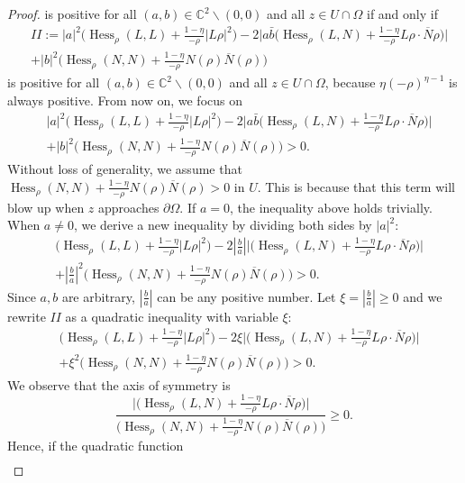 \documentclass[11pt]{article}
\theoremstyle{plain} \numberwithin{equation}{section}
\theoremstyle{definition}
\DeclareMathOperator{\Hessian}{Hess}
\begin{document}
\begin{proof}
	is positive for all $(a,b)\in\mathbb{C}^2\backslash(0,0)$ and all $z\in U\cap\Omega$ if and only if \[\begin{split}
	&I\!I:=|a|^2\Big(\Hessian_\rho (L, L)+\frac{1-\eta}{-\rho}|L\rho|^2\Big)-2\Big|a\bar{b}\Big(\Hessian_\rho (L, N)+\frac{1-\eta}{-\rho}L\rho\cdot\overline{N}\rho\Big)\Big|\\&+|b|^2 \Big(\Hessian_\rho (N, N)+\frac{1-\eta}{-\rho}N(\rho)\overline{N} (\rho)\Big)
	\end{split}\] is positive for all $(a,b)\in\mathbb{C}^2\backslash(0,0)$ and all $z\in U\cap\Omega$, because $\eta(-\rho)^{\eta-1}$ is always positive. From now on, we focus on \[\begin{split}
	&|a|^2\Big(\Hessian_\rho (L, L)+\frac{1-\eta}{-\rho}|L\rho|^2\Big)-2\Big|a\bar{b}\Big(\Hessian_\rho (L, N)+\frac{1-\eta}{-\rho}L\rho\cdot\overline{N}\rho\Big)\Big|\\&+|b|^2 \Big(\Hessian_\rho (N, N)+\frac{1-\eta}{-\rho}N(\rho)\overline{N} (\rho)\Big)>0.
	\end{split}\] Without loss of generality, we assume that $\Hessian_\rho (N, N)+\frac{1-\eta}{-\rho}N(\rho)\overline{N} (\rho)>0$ in $U$. This is because that this term will blow up when $z$ approaches $\partial\Omega$. If $a=0$, the inequality above holds trivially. When $a\neq 0$, we derive a new inequality by dividing both sides by $|a|^2$: \[\begin{split}
	&\Big(\Hessian_\rho (L, L)+\frac{1-\eta}{-\rho}|L\rho|^2\Big)-2\left|\frac{b}{a}\right|\Big|\Big(\Hessian_\rho (L, N)+\frac{1-\eta}{-\rho}L\rho\cdot\overline{N}\rho\Big)\Big|\\&+\left|\frac{b}{a}\right|^2 \Big(\Hessian_\rho (N, N)+\frac{1-\eta}{-\rho}N(\rho)\overline{N} (\rho)\Big)>0.
	\end{split}\] Since $a,b$ are arbitrary, $\left|\frac{b}{a}\right|$ can be any positive number. Let $\xi=|\frac{b}{a}|\geq 0$ and we rewrite $I\!I$ as a quadratic inequality with variable $\xi$: \begin{equation}\label{quad}
		\begin{split}
		&\Big(\Hessian_\rho (L, L)+\frac{1-\eta}{-\rho}|L\rho|^2\Big)-2\xi\Big|\Big(\Hessian_\rho (L, N)+\frac{1-\eta}{-\rho}L\rho\cdot\overline{N}\rho\Big)\Big|\\&+\xi^2 \Big(\Hessian_\rho (N, N)+\frac{1-\eta}{-\rho}N(\rho)\overline{N} (\rho)\Big)>0.
		\end{split}
	\end{equation} We observe that the axis of symmetry is \[\frac{\Big|\Big(\Hessian_\rho (L, N)+\frac{1-\eta}{-\rho}L\rho\cdot\overline{N}\rho\Big)\Big|}{\Big(\Hessian_\rho (N, N)+\frac{1-\eta}{-\rho}N(\rho)\overline{N} (\rho)\Big)}\geq 0.\] Hence, if the quadratic function \[\begin{split}

\end{split}\]
\end{proof}
\end{document}
